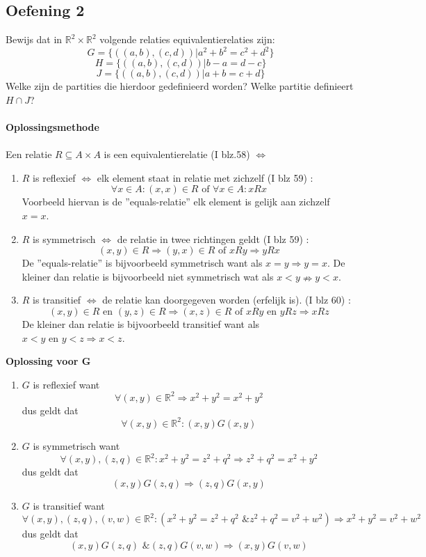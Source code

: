 \documentclass[11pt,a4paper,titlepage]{article}
\begin{document}
\subsection{Oefening 2}
Bewijs dat in $\mathbb{R}^2\times\mathbb{R}^2$ volgende relaties equivalentierelaties zijn:
	$$ G = \{((a, b),(c, d))|a^2 + b^2 = c^2 + d^2\}$$
	$$ H = \{((a, b),(c, d))|b-a = d-c\}$$
	$$ J = \{((a, b),(c, d))|a+b = c+d\}$$
Welke zijn de partities die hierdoor gedefinieerd worden? Welke partitie definieert $H \cap J$? \\ \\
\textbf{Oplossingsmethode} \\ \\
Een relatie $R \subseteq A\times A$ is een equivalentierelatie (I blz.58) $\Leftrightarrow$
\begin{enumerate}
\item $R$ is reflexief $\Leftrightarrow$ elk element staat in relatie met zichzelf (I blz 59) :
	$$\forall x\in A : (x,x) \in R \text{ of } \forall x\in A : xRx$$
	Voorbeeld hiervan is de ''equals-relatie'' elk element is gelijk aan zichzelf $x=x$.
\item $R$ is symmetrisch $\Leftrightarrow$ de relatie in twee richtingen geldt (I blz 59) :
	$$(x,y) \in R \Rightarrow (y,x)\in R \text{ of } xRy\Rightarrow  yRx$$
	De ''equals-relatie'' is bijvoorbeeld symmetrisch want als $x=y \Rightarrow y=x$.
	De kleiner dan relatie is bijvoorbeeld niet symmetrisch wat als $x<y \nRightarrow y<x$.
\item $R$ is transitief $\Leftrightarrow$ de relatie kan doorgegeven worden (erfelijk is). (I blz 60) :
	$$(x,y) \in R\text{ en } (y,z) \in R \Rightarrow (x,z)\in R \text{ of } xRy\text{ en } yRz\Rightarrow  xRz$$
	De kleiner dan relatie is bijvoorbeeld transitief want als $x<y \text{ en } y < z \Rightarrow x < z$.
\end{enumerate}
\textbf{Oplossing voor G}
\begin{enumerate}
\item $G$ is reflexief want
	$$ \forall (x,y) \in\mathbb{R}^2  \Rightarrow x^2 + y^2 = x^2 + y^2$$
	dus geldt dat 
	$$ \forall (x,y) \in\mathbb{R}^2 : (x,y)G(x,y)$$
\item $G$ is symmetrisch want
	$$ \forall (x,y), (z,q) \in\mathbb{R}^2: x^2 + y^2 = z^2 + q^2 \Rightarrow  z^2 + q^2 = x^2 + y^2 $$
	dus geldt dat 
	$$ (x,y)G(z,q) \Rightarrow (z,q)G(x,y) $$
\item $G$ is transitief want
	$$ \forall (x,y), (z,q),(v,w) \in\mathbb{R}^2: (x^2 + y^2 = z^2 + q^2 \text{ \& } z^2 + q^2 = v^2 + w^2)  \Rightarrow  x^2 + y^2 = v^2 + w^2 $$
	dus geldt dat
	$$ (x,y)G(z,q) \text{ \& } (z,q)G(v,w)  \Rightarrow (x,y)G(v,w) $$
\end{enumerate}
\end{document}
